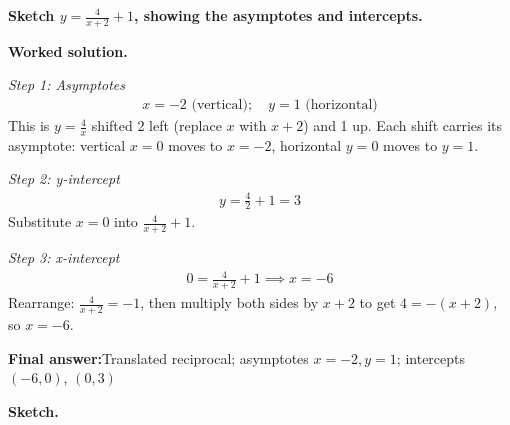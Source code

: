 \documentclass[11pt]{article}
\newcommand{\question}[1]{\par\medskip\noindent\textbf{#1}\par}
\begin{document}
\question{Sketch \( y = \frac{4}{x+2} + 1 \), showing the asymptotes and intercepts.}

\textbf{Worked solution.}

\textit{Step 1: Asymptotes}
\[\begin{gathered}
x = -2 \text{ (vertical)}; \quad y = 1 \text{ (horizontal)}
\end{gathered}\]
This is \( y = \tfrac{4}{x} \) shifted 2 left (replace \( x \) with \( x + 2 \)) and 1 up. Each shift carries its asymptote: vertical \( x = 0 \) moves to \( x = -2 \), horizontal \( y = 0 \) moves to \( y = 1 \).

\textit{Step 2: y-intercept}
\[\begin{gathered}
y = \frac{4}{2} + 1 = 3
\end{gathered}\]
Substitute \( x = 0 \) into \( \tfrac{4}{x+2} + 1 \).

\textit{Step 3: x-intercept}
\[\begin{gathered}
0 = \frac{4}{x+2} + 1 \implies x = -6
\end{gathered}\]
Rearrange: \( \tfrac{4}{x+2} = -1 \), then multiply both sides by \( x + 2 \) to get \( 4 = -(x+2) \), so \( x = -6 \).

\begin{answerbox}
\textbf{Final answer:}\quad Translated reciprocal; asymptotes \(\displaystyle x = -2, y = 1\); intercepts \(\displaystyle (-6,0)\), \(\displaystyle (0,3)\)
\end{answerbox}
\textbf{Sketch.}
\end{document}
